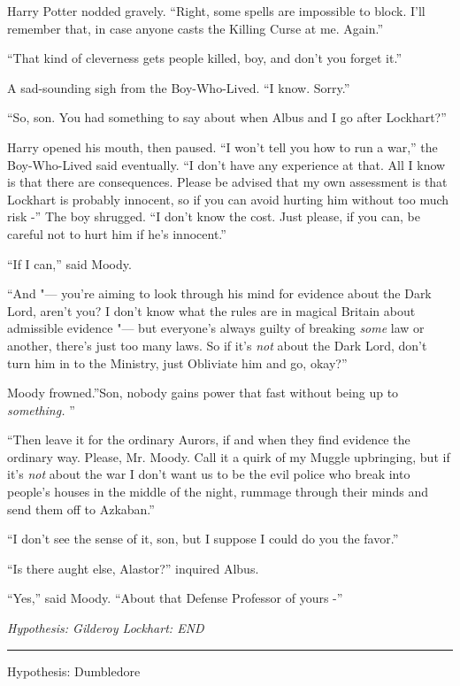 Harry Potter nodded gravely. ``Right, some spells are impossible to
block. I'll remember that, in case anyone casts the Killing Curse at me.
Again.''

``That kind of cleverness gets people killed, boy, and don't you forget
it.''

A sad-sounding sigh from the Boy-Who-Lived. ``I know. Sorry.''

``So, son. You had something to say about when Albus and I go after
Lockhart?''

Harry opened his mouth, then paused. ``I won't tell you how to run a
war,'' the Boy-Who-Lived said eventually. ``I don't have any experience
at that. All I know is that there are consequences. Please be advised
that my own assessment is that Lockhart is probably innocent, so if you
can avoid hurting him without too much risk -'' The boy shrugged. ``I
don't know the cost. Just please, if you can, be careful not to hurt him
if he's innocent.''

``If I can,'' said Moody.

``And "--- you're aiming to look through his mind for evidence about the
Dark Lord, aren't you? I don't know what the rules are in magical
Britain about admissible evidence "--- but everyone's always guilty of
breaking \emph{some} law or another, there's just too many laws. So if
it's \emph{not} about the Dark Lord, don't turn him in to the Ministry,
just Obliviate him and go, okay?''

Moody frowned.''Son, nobody gains power that fast without being up to
\emph{something.} ''

``Then leave it for the ordinary Aurors, if and when they find evidence
the ordinary way. Please, Mr. Moody. Call it a quirk of my Muggle
upbringing, but if it's \emph{not} about the war I don't want us to be
the evil police who break into people's houses in the middle of the
night, rummage through their minds and send them off to Azkaban.''

``I don't see the sense of it, son, but I suppose I could do you the
favor.''

``Is there aught else, Alastor?'' inquired Albus.

``Yes,'' said Moody. ``About that Defense Professor of yours -''

\emph{Hypothesis: Gilderoy Lockhart: END}

\begin{center}\rule{3in}{0.4pt}\end{center}

Hypothesis: Dumbledore

